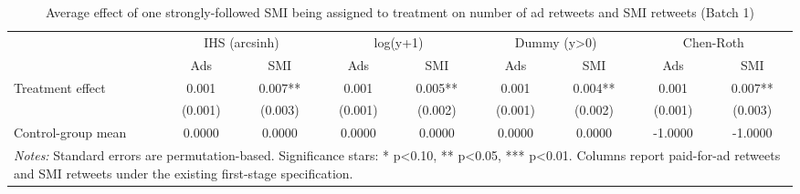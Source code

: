 \begin{table}[!htbp]
\centering
\caption{Average effect of one strongly-followed SMI being assigned to treatment on number of ad retweets and SMI retweets (Batch 1)}
\begin{tabular}{lcccccccc}
\hline
 & \multicolumn{2}{c}{IHS (arcsinh)} & \multicolumn{2}{c}{log(y+1)} & \multicolumn{2}{c}{Dummy (y>0)} & \multicolumn{2}{c}{Chen-Roth} \\
 & Ads & SMI & Ads & SMI & Ads & SMI & Ads & SMI \\
\hline
Treatment effect & 0.001 & 0.007** & 0.001 & 0.005** & 0.001 & 0.004** & 0.001 & 0.007** \\
 & (0.001) & (0.003) & (0.001) & (0.002) & (0.001) & (0.002) & (0.001) & (0.003) \\
Control-group mean & 0.0000 & 0.0000 & 0.0000 & 0.0000 & 0.0000 & 0.0000 & -1.0000 & -1.0000 \\
\hline
\multicolumn{9}{l}{\parbox[t]{15.5cm}{\textit{Notes:} Standard errors are permutation-based. Significance stars: * p<0.10, ** p<0.05, *** p<0.01. Columns report paid-for-ad retweets and SMI retweets under the existing first-stage specification.}} \\
\end{tabular}
\end{table}
